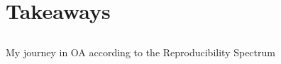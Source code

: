 \section{Takeaways}



\subsection{}
{

\begin{frame}{My journey in OA according to the Reproducibility Spectrum}

    \begin{figure}
   \end{figure}
	
\end{frame}
}





